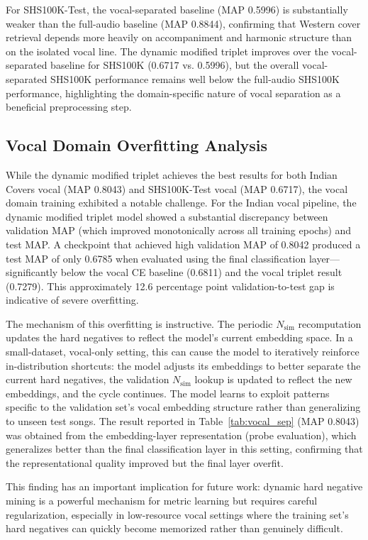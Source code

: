 \documentclass[conference]{IEEEtran}
\begin{document}
For SHS100K-Test, the vocal-separated baseline (MAP 0.5996) is substantially weaker than the full-audio baseline (MAP 0.8844), confirming that Western cover retrieval depends more heavily on accompaniment and harmonic structure than on the isolated vocal line. The dynamic modified triplet improves over the vocal-separated baseline for SHS100K (0.6717 vs. 0.5996), but the overall vocal-separated SHS100K performance remains well below the full-audio SHS100K performance, highlighting the domain-specific nature of vocal separation as a beneficial preprocessing step.

\subsection{Vocal Domain Overfitting Analysis}

While the dynamic modified triplet achieves the best results for both Indian Covers vocal (MAP 0.8043) and SHS100K-Test vocal (MAP 0.6717), the vocal domain training exhibited a notable challenge. For the Indian vocal pipeline, the dynamic modified triplet model showed a substantial discrepancy between validation MAP (which improved monotonically across all training epochs) and test MAP. A checkpoint that achieved high validation MAP of 0.8042 produced a test MAP of only 0.6785 when evaluated using the final classification layer—significantly below the vocal CE baseline (0.6811) and the vocal triplet result (0.7279). This approximately 12.6 percentage point validation-to-test gap is indicative of severe overfitting.

The mechanism of this overfitting is instructive. The periodic $N_{\text{sim}}$ recomputation updates the hard negatives to reflect the model's current embedding space. In a small-dataset, vocal-only setting, this can cause the model to iteratively reinforce in-distribution shortcuts: the model adjusts its embeddings to better separate the current hard negatives, the validation $N_{\text{sim}}$ lookup is updated to reflect the new embeddings, and the cycle continues. The model learns to exploit patterns specific to the validation set's vocal embedding structure rather than generalizing to unseen test songs. The result reported in Table~\ref{tab:vocal_sep} (MAP 0.8043) was obtained from the embedding-layer representation (probe evaluation), which generalizes better than the final classification layer in this setting, confirming that the representational quality improved but the final layer overfit.

This finding has an important implication for future work: dynamic hard negative mining is a powerful mechanism for metric learning but requires careful regularization, especially in low-resource vocal settings where the training set's hard negatives can quickly become memorized rather than genuinely difficult.
\end{document}
